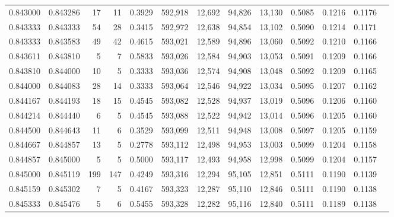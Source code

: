 \begin{tabular}{rrrrrrrrrrrrr}
0.843000 & 0.843286 &    17 &  11 &                                     0.3929 & 592,918 &  12,692 &  94,826 &  13,130 & 0.5085 & 0.1216 & 0.1176 \\
0.843333 & 0.843333 &    54 &  28 &                                     0.3415 & 592,972 &  12,638 &  94,854 &  13,102 & 0.5090 & 0.1214 & 0.1171 \\
0.843333 & 0.843583 &    49 &  42 &                                     0.4615 & 593,021 &  12,589 &  94,896 &  13,060 & 0.5092 & 0.1210 & 0.1166 \\
0.843611 & 0.843810 &     5 &   7 &                                     0.5833 & 593,026 &  12,584 &  94,903 &  13,053 & 0.5091 & 0.1209 & 0.1166 \\
0.843810 & 0.844000 &    10 &   5 &                                     0.3333 & 593,036 &  12,574 &  94,908 &  13,048 & 0.5092 & 0.1209 & 0.1165 \\
0.844000 & 0.844083 &    28 &  14 &                                     0.3333 & 593,064 &  12,546 &  94,922 &  13,034 & 0.5095 & 0.1207 & 0.1162 \\
0.844167 & 0.844193 &    18 &  15 &                                     0.4545 & 593,082 &  12,528 &  94,937 &  13,019 & 0.5096 & 0.1206 & 0.1160 \\
0.844214 & 0.844440 &     6 &   5 &                                     0.4545 & 593,088 &  12,522 &  94,942 &  13,014 & 0.5096 & 0.1205 & 0.1160 \\
0.844500 & 0.844643 &    11 &   6 &                                     0.3529 & 593,099 &  12,511 &  94,948 &  13,008 & 0.5097 & 0.1205 & 0.1159 \\
0.844667 & 0.844857 &    13 &   5 &                                     0.2778 & 593,112 &  12,498 &  94,953 &  13,003 & 0.5099 & 0.1204 & 0.1158 \\
0.844857 & 0.845000 &     5 &   5 &                                     0.5000 & 593,117 &  12,493 &  94,958 &  12,998 & 0.5099 & 0.1204 & 0.1157 \\
0.845000 & 0.845119 &   199 & 147 &                                     0.4249 & 593,316 &  12,294 &  95,105 &  12,851 & 0.5111 & 0.1190 & 0.1139 \\
0.845159 & 0.845302 &     7 &   5 &                                     0.4167 & 593,323 &  12,287 &  95,110 &  12,846 & 0.5111 & 0.1190 & 0.1138 \\
0.845333 & 0.845476 &     5 &   6 &                                     0.5455 & 593,328 &  12,282 &  95,116 &  12,840 & 0.5111 & 0.1189 & 0.1138 \\

\end{tabular}
